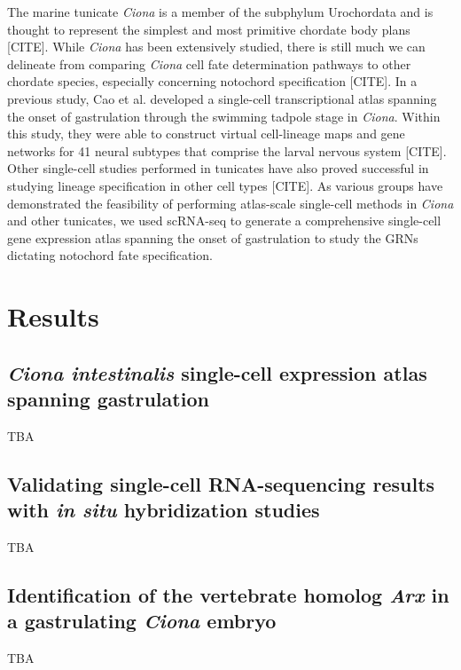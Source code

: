 The marine tunicate \textit{Ciona} is a member of the subphylum Urochordata and is thought to represent the simplest and most primitive chordate body plans [CITE]. While \textit{Ciona} has been extensively studied, there is still much we can delineate from comparing \textit{Ciona} cell fate determination pathways to other chordate species, especially concerning notochord specification [CITE]. In a previous study, Cao et al. developed a single-cell transcriptional atlas spanning the onset of gastrulation through the swimming tadpole stage in \textit{Ciona}. Within this study, they were able to construct virtual cell-lineage maps and gene networks for 41 neural subtypes that comprise the larval nervous system [CITE]. Other single-cell studies performed in tunicates have also proved successful in studying lineage specification in other cell types [CITE]. As various groups have demonstrated the feasibility of performing atlas-scale single-cell methods in \textit{Ciona} and other tunicates, we used scRNA-seq to generate a comprehensive single-cell gene expression atlas spanning the onset of gastrulation to study the GRNs dictating notochord fate specification. 

\section{Results}

\subsection{\textit{Ciona intestinalis} single-cell expression atlas spanning gastrulation}

TBA

\subsection{Validating single-cell RNA-sequencing results with \textit{in situ} hybridization studies}

TBA

\subsection{Identification of the vertebrate homolog \textit{Arx} in a gastrulating \textit{Ciona} embryo}

TBA

